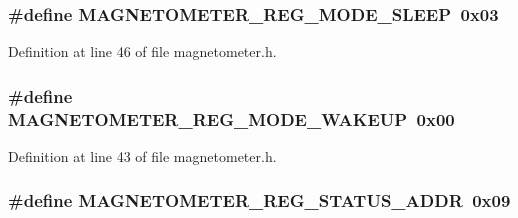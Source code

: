 \subsubsection[{\texorpdfstring{M\+A\+G\+N\+E\+T\+O\+M\+E\+T\+E\+R\+\_\+\+R\+E\+G\+\_\+\+M\+O\+D\+E\+\_\+\+S\+L\+E\+EP}{MAGNETOMETER_REG_MODE_SLEEP}}]{\setlength{\rightskip}{0pt plus 5cm}\#define M\+A\+G\+N\+E\+T\+O\+M\+E\+T\+E\+R\+\_\+\+R\+E\+G\+\_\+\+M\+O\+D\+E\+\_\+\+S\+L\+E\+EP~0x03}\hypertarget{group___magnetometer_ga4eb47c9370e041e3ad6708d51ea7d574}{}\label{group___magnetometer_ga4eb47c9370e041e3ad6708d51ea7d574}


Definition at line 46 of file magnetometer.\+h.

\subsubsection[{\texorpdfstring{M\+A\+G\+N\+E\+T\+O\+M\+E\+T\+E\+R\+\_\+\+R\+E\+G\+\_\+\+M\+O\+D\+E\+\_\+\+W\+A\+K\+E\+UP}{MAGNETOMETER_REG_MODE_WAKEUP}}]{\setlength{\rightskip}{0pt plus 5cm}\#define M\+A\+G\+N\+E\+T\+O\+M\+E\+T\+E\+R\+\_\+\+R\+E\+G\+\_\+\+M\+O\+D\+E\+\_\+\+W\+A\+K\+E\+UP~0x00}\hypertarget{group___magnetometer_gadae52ebace00b6a050bc901005e3fc36}{}\label{group___magnetometer_gadae52ebace00b6a050bc901005e3fc36}


Definition at line 43 of file magnetometer.\+h.

\subsubsection[{\texorpdfstring{M\+A\+G\+N\+E\+T\+O\+M\+E\+T\+E\+R\+\_\+\+R\+E\+G\+\_\+\+S\+T\+A\+T\+U\+S\+\_\+\+A\+D\+DR}{MAGNETOMETER_REG_STATUS_ADDR}}]{\setlength{\rightskip}{0pt plus 5cm}\#define M\+A\+G\+N\+E\+T\+O\+M\+E\+T\+E\+R\+\_\+\+R\+E\+G\+\_\+\+S\+T\+A\+T\+U\+S\+\_\+\+A\+D\+DR~0x09}\hypertarget{group___magnetometer_gabe3a5b0475383fb2a6155f3ffb293be5}{}\label{group___magnetometer_gabe3a5b0475383fb2a6155f3ffb293be5}


